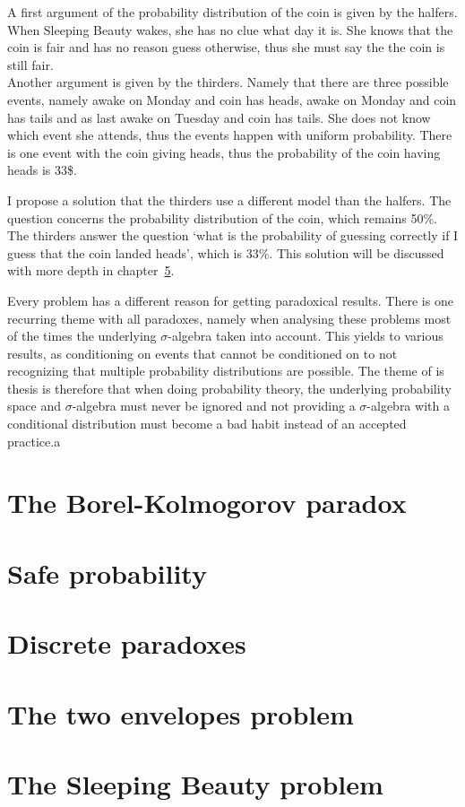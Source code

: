 \documentclass[twoside,a4paper]{report}
\theoremstyle{plain}
\theoremstyle{definition}
\theoremstyle{remark}
\numberwithin{equation}{chapter}
\DeclareMathOperator{\1}{\mathbbm{1}}
\begin{document}
A first argument of the probability distribution of the coin is given by the halfers. When Sleeping Beauty wakes, she has no clue what day it is. She knows that the coin is fair and has no reason guess otherwise, thus she must say the the coin is still fair.\\
Another argument is given by the thirders. Namely that there are three possible events, namely awake on Monday and coin has heads, awake on Monday and coin has tails and as last awake on Tuesday and coin has tails. She does not know which event she attends, thus the events happen with uniform probability. There is one event with the coin giving heads, thus the probability of the coin having heads is 33\$.

I propose a solution that the thirders use a different model than the halfers. The question concerns the probability distribution of the coin, which remains 50\%. The thirders answer the question `what is the probability of guessing correctly if I guess that the coin landed heads', which is 33\%. This solution will be discussed with more depth in chapter~\ref{chap:SleepingBeauty}.

Every problem has a different reason for getting paradoxical results. There is one recurring theme with all paradoxes, namely when analysing these problems most of the times the underlying $\sigma$-algebra taken into account. This yields to various results, as conditioning on events that cannot be conditioned on to not recognizing that multiple probability distributions are possible. The theme of is thesis is therefore that when doing probability theory, the underlying probability space and $\sigma$-algebra must never be ignored and not providing a $\sigma$-algebra with a conditional distribution must become a bad habit instead of an accepted practice.a

\chapter{The Borel-Kolmogorov paradox}\label{chap:BorelKolmogorov}

\chapter{Safe probability}\label{chap:SafeProp}

\chapter{Discrete paradoxes}\label{chap:DiscPara}

\chapter{The two envelopes problem}\label{chap:TwoEnvelope}

\chapter{The Sleeping Beauty problem}\label{chap:SleepingBeauty}




\appendix

\newpage

\printindex
\end{document}
